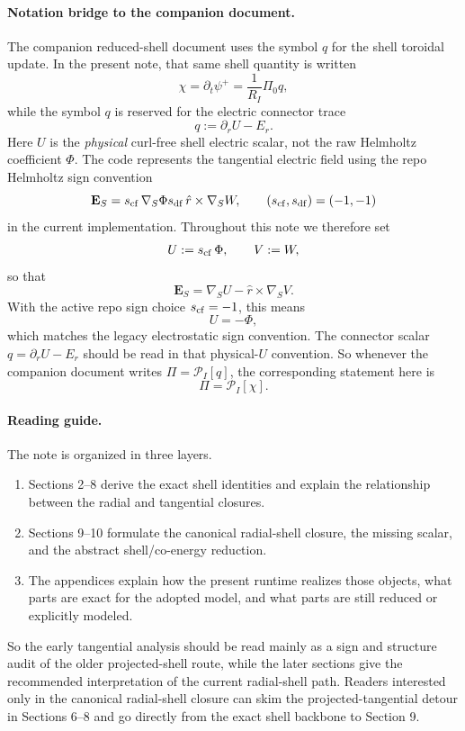 \documentclass[11pt,a4paper]{article}
\begin{document}
\paragraph{Notation bridge to the companion document.}
The companion reduced-shell document uses the symbol \(q\) for the shell
toroidal update. In the present note, that same shell quantity is written
\[
\chi=\partial_t\psi^+ = \frac{1}{R_I}\Pi_0 q,
\]
while the symbol \(q\) is reserved for the electric connector trace
\[
q:=\partial_r U-E_r.
\]
Here \(U\) is the \emph{physical} curl-free shell electric scalar, not the raw
Helmholtz coefficient \(\Phi\). The code represents the tangential electric
field using the repo Helmholtz sign convention
\[
\mathbf E_S
=
s_{\rm cf}\,\nabla_S\Phi
s_{\rm df}\,\hat r\times \nabla_S W,
\qquad
(s_{\rm cf},s_{\rm df})=(-1,-1)
\]
in the current implementation. Throughout this note we therefore set
\[
U := s_{\rm cf}\,\Phi,
\qquad
V := W,
\]
so that
\[
\mathbf E_S = \nabla_S U - \hat r\times \nabla_S V.
\]
With the active repo sign choice \(s_{\rm cf}=-1\), this means
\[
U=-\Phi,
\]
which matches the legacy electrostatic sign convention. The connector scalar
\(q=\partial_r U-E_r\) should be read in that physical-\(U\) convention.
So whenever the companion document writes \(\Pi=\mathcal P_I[q]\), the
corresponding statement here is
\[
\Pi=\mathcal P_I[\chi].
\]

\paragraph{Reading guide.}
The note is organized in three layers.
\begin{enumerate}
\item Sections 2--8 derive the exact shell identities and explain the
relationship between the radial and tangential closures.
\item Sections 9--10 formulate the canonical radial-shell closure, the missing
scalar, and the abstract shell/co-energy reduction.
\item The appendices explain how the present runtime realizes those objects,
what parts are exact for the adopted model, and what parts are still reduced
or explicitly modeled.
\end{enumerate}
So the early tangential analysis should be read mainly as a sign and structure
audit of the older projected-shell route, while the later sections give the
recommended interpretation of the current radial-shell path.
Readers interested only in the canonical radial-shell closure can skim the
projected-tangential detour in Sections 6--8 and go directly from the exact
shell backbone to Section 9.
\end{document}
